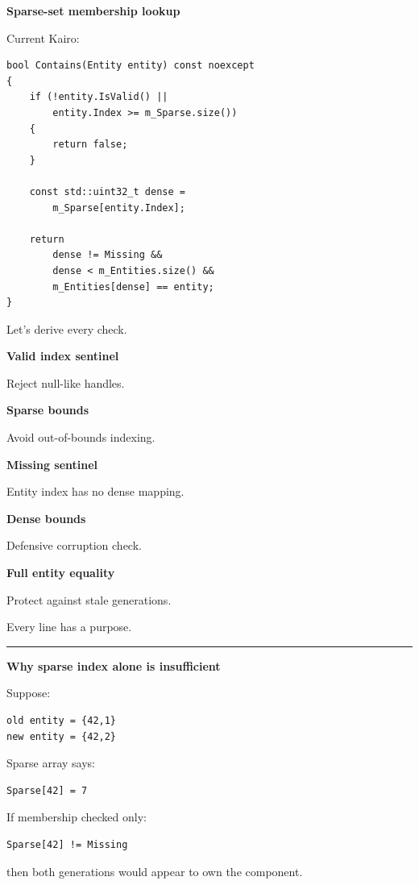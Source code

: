 \textbf{Sparse-set membership lookup}

Current Kairo:

\begin{verbatim}
bool Contains(Entity entity) const noexcept
{
    if (!entity.IsValid() ||
        entity.Index >= m_Sparse.size())
    {
        return false;
    }

    const std::uint32_t dense =
        m_Sparse[entity.Index];

    return
        dense != Missing &&
        dense < m_Entities.size() &&
        m_Entities[dense] == entity;
}
\end{verbatim}

Let's derive every check.

\textbf{Valid index sentinel}

Reject null-like handles.

\textbf{Sparse bounds}

Avoid out-of-bounds indexing.

\textbf{Missing sentinel}

Entity index has no dense mapping.

\textbf{Dense bounds}

Defensive corruption check.

\textbf{Full entity equality}

Protect against stale generations.

Every line has a purpose.

\begin{center}\rule{0.5\linewidth}{0.5pt}\end{center}

\textbf{Why sparse index alone is insufficient}

Suppose:

\begin{verbatim}
old entity = {42,1}
new entity = {42,2}
\end{verbatim}

Sparse array says:

\begin{verbatim}
Sparse[42] = 7
\end{verbatim}

If membership checked only:

\begin{verbatim}
Sparse[42] != Missing
\end{verbatim}

then both generations would appear to own the component.

